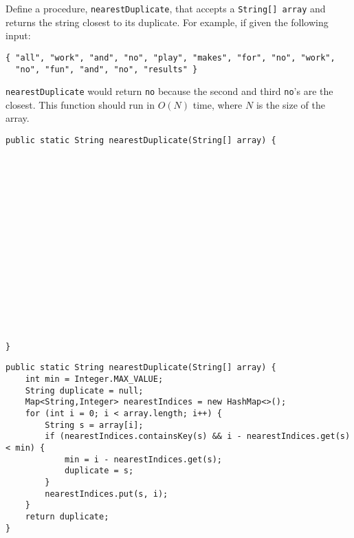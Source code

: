 \begin{blocksection}
\question Define a procedure, \lstinline$nearestDuplicate$, that accepts a
\lstinline$String[] array$ and returns the string closest to its duplicate. For
example, if given the following input:

\begin{verbatim}
{ "all", "work", "and", "no", "play", "makes", "for", "no", "work",
  "no", "fun", "and", "no", "results" }
\end{verbatim}

\lstinline$nearestDuplicate$ would return \lstinline$no$ because the second and
third \lstinline$no$'s are the closest. This function should run in $O(N)$
time, where $N$ is the size of the array.

\ifprintanswers
\else
\begin{lstlisting}
public static String nearestDuplicate(String[] array) {

















}
\end{lstlisting}
\fi

\begin{solution}
\begin{lstlisting}
public static String nearestDuplicate(String[] array) {
    int min = Integer.MAX_VALUE;
    String duplicate = null;
    Map<String,Integer> nearestIndices = new HashMap<>();
    for (int i = 0; i < array.length; i++) {
        String s = array[i];
        if (nearestIndices.containsKey(s) && i - nearestIndices.get(s) < min) {
            min = i - nearestIndices.get(s);
            duplicate = s;
        }
        nearestIndices.put(s, i);
    }
    return duplicate;
}
\end{lstlisting}
\end{solution}
\end{blocksection}
